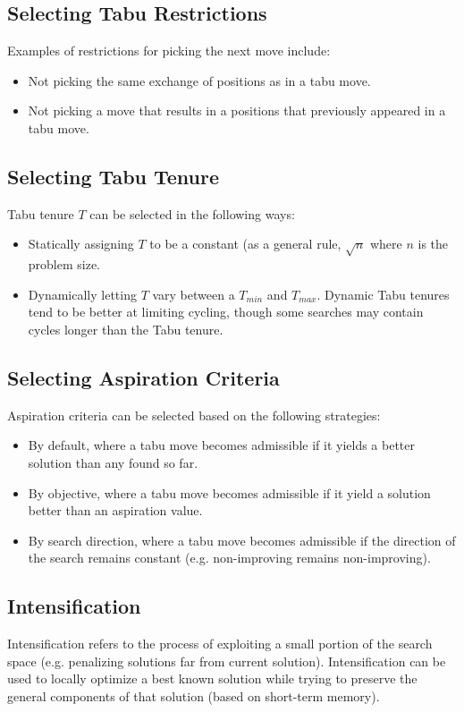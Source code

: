 \documentclass[12pt,titlepage]{article}
\begin{document}
    \subsection{Selecting Tabu Restrictions}
      Examples of restrictions for picking the next move include:
      \begin{itemize}
        \item Not picking the same exchange of positions as in a tabu move.
        \item Not picking a move that results in a positions that previously appeared in a tabu move.
      \end{itemize}

    \subsection{Selecting Tabu Tenure}
      Tabu tenure $T$ can be selected in the following ways:
      \begin{itemize}
        \item Statically assigning $T$ to be a constant (as a general rule, $\sqrt{n}$ where $n$ is the problem size.
        \item Dynamically letting $T$ vary between a $T_{min}$ and $T_{max}$. Dynamic Tabu tenures tend to be better at limiting cycling,
        though some searches may contain cycles longer than the Tabu tenure.
      \end{itemize}

    \subsection{Selecting Aspiration Criteria}
      Aspiration criteria can be selected based on the following strategies:
      \begin{itemize}
        \item By default, where a tabu move becomes admissible if it yields a better solution than any found so far.
        \item By objective, where a tabu move becomes admissible if it yield a solution better than an aspiration value.
        \item By search direction, where a tabu move becomes admissible if the direction of the search remains constant (e.g. non-improving remains non-improving).
      \end{itemize}

    \subsection{Intensification}
      Intensification refers to the process of exploiting a small portion of the search space (e.g. penalizing solutions far from current solution). Intensification
      can be used to locally optimize a best known solution while trying to preserve the general components of that solution (based on short-term memory).
\end{document}
